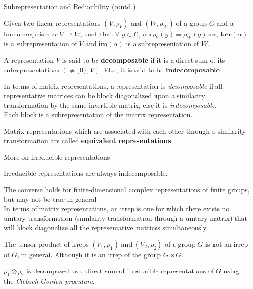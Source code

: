 \documentclass{beamer}
\newcommand\boldtext[1]{\textcolor{bolds}{\textbf{#1}}}
\newcommand\italictext[1]{\textcolor{italics}{\textit{#1}}}
\begin{document}
\begin{frame}{Subrepresentation and Reducibility (contd.)}
    \begin{theorem}
        Given two linear representations $(V,\rho_V)$ and $(W,\rho_W)$ of a group $G$ and a homomorphism $\alpha:V\xrightarrow{}W$, such that $\forall$ $g\in G$, $\alpha\circ\rho_V(g)=\rho_W(g)\circ\alpha$, $\mathbf{ker}(\alpha)$ is a subrepresentation of $V$ and $\mathbf{im}(\alpha)$ is a subrepresentation of $W$. 
    \end{theorem}
    \begin{definition}
        A representation $V$ is said to be \boldtext{decomposable} if it is a direct sum of its subrepresentations $(\neq\{0\},V)$. Else, it is said to be \boldtext{indecomposable}.
    \end{definition}
    In terms of matrix representations, a representation is \italictext{decomposable} if all representative matrices can be block diagonalized upon a similarity transformation by the same invertible matrix, else it is \italictext{indecomposable}.\\
    Each block is a subrepresentation of the matrix representation.
    \begin{definition}
        Matrix representations which are associated with each other through a similarity transformation are called \boldtext{equivalent representations}.
    \end{definition}
\end{frame}

\begin{frame}{More on irreducible representations}
    \begin{theorem}
        Irreducible representations are always indecomposable.
    \end{theorem}
    The converse holds for finite-dimensional complex representations of finite groups, but may not be true in general.\\
    In terms of matrix representations, an irrep is one for which there exists no unitary transformation (similarity transformation through a unitary matrix) that will block diagonalize all the representative matrices simultaneously.\\
    \begin{theorem}
        The tensor product of irreps $(V_1,\rho_1)$ and $(V_2,\rho_2)$ of a group $G$ is not an irrep of $G$, in general. Although it is an irrep of the group $G\times G$.
    \end{theorem}
    $\rho_1\otimes\rho_2$ is decomposed as a direct sum of irreducible representations of $G$ using the \italictext{Clebsch-Gordan procedure}.
\end{frame}
\end{document}
